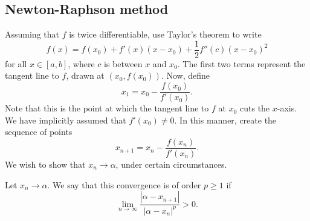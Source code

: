 \documentclass[11pt]{article}
\theoremstyle{definition}
\theoremstyle{remark}
\numberwithin{equation}{section}
\begin{document}
    \subsection{Newton-Raphson method}
    Assuming that $f$ is twice differentiable, use Taylor's theorem to write \[
        f(x) = f(x_0) + f'(x)(x - x_0) + \frac{1}{2}f''(c)(x - x_0)^2
    \] for all $x \in [a, b]$, where $c$ is between $x$ and $x_0$. The first two
    terms represent the tangent line to $f$, drawn at $(x_0, f(x_0))$. Now, define \[
        x_1 = x_0 - \frac{f(x_0)}{f'(x_0)}.
    \] Note that this is the point at which the tangent line to $f$ at $x_0$ cuts the
    $x$-axis. We have implicitly assumed that $f'(x_0) \neq 0$. In this manner,
    create the sequence of points \[
        x_{n + 1} = x_n - \frac{f(x_n)}{f'(x_n)}.
    \] We wish to show that $x_n \to \alpha$, under certain circumstances.

    \begin{definition}
        Let $x_n \to \alpha$. We say that this convergence is of order $p \geq 1$ if
        \[
            \lim_{n \to \infty} \frac{|\alpha - x_{n + 1}|}{|\alpha - x_n|^p} > 0.
        \] 
    \end{definition}
\end{document}
